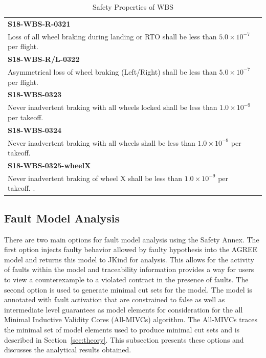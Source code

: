 \begin{table}[]
\begin{tabular}{@{}ll}
\toprule
\textbf{S18-WBS-R-0321} \\Loss of all wheel braking during landing or RTO shall be less than $5.0 \times 10^{-7}$ per flight.                                    \\ \midrule 
\textbf{S18-WBS-R/L-0322}  \\ Asymmetrical loss of wheel braking (Left/Right) shall be less than $5.0 \times 10^{-7}$ per flight. \\ \midrule
\textbf{S18-WBS-0323} \\ Never inadvertent braking with all wheels locked shall be less than $1.0 \times 10^{-9}$ per takeoff.                                                                                                                                                                                                               \\ \midrule
\textbf{S18-WBS-0324}  \\ Never inadvertent braking with all wheels shall be less than $1.0 \times 10^{-9}$ per takeoff.                                                                                                            \\ \midrule
\textbf{S18-WBS-0325-wheelX} \\ Never inadvertent braking of wheel X shall be less than $1.0 \times 10^{-9}$ per takeoff.                                                                                                           .                                                                                                                 \\ \bottomrule
\end{tabular}
\caption{Safety Properties of WBS}
\label{tab:safetyProperties}
\end{table}  

\subsection{Fault Model Analysis}
There are two main options for fault model analysis using the Safety Annex. The first option injects faulty behavior allowed by faulty hypothesis into the AGREE model and returns this model to JKind for analysis. This allows for the activity of faults within the model and traceability information provides a way for users to view a counterexample to a violated contract in the presence of faults. The second option is used to generate minimal cut sets for the model. The model is annotated with fault activation that are constrained to false as well as intermediate level guarantees as model elements for consideration for the all Minimal Inductive Validity Cores (All-MIVCs)
algorithm. The All-MIVCs traces the minimal set of model elements used to produce minimal cut sets and is described in Section~\ref{sec:theory}. This subsection presents these options and discusses the analytical results obtained. 

